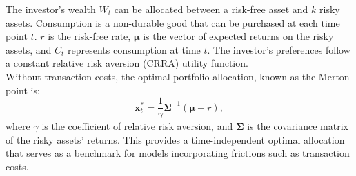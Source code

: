 \documentclass[11pt]{article}
\begin{document}
The investor's wealth \(W_t\) can be allocated between a risk-free asset and \(k\) risky assets.
Consumption is a non-durable good that can be purchased at each time point \(t\).
\(r\) is the risk-free rate, \(\boldsymbol{\mu}\) is the vector of expected returns on the risky assets, and \(C_t\) represents consumption at time \(t\). The investor’s preferences follow a constant relative risk aversion (CRRA) utility function.\\
Without transaction costs, the optimal portfolio allocation, known as the Merton point is:
\begin{equation}
    \mathbf{x}_t^* = \frac{1}{\gamma} \boldsymbol{\Sigma}^{-1} (\boldsymbol{\mu} - r ),
\end{equation}
where \(\gamma\) is the coefficient of relative risk aversion, and \(\boldsymbol{\Sigma}\) is the covariance matrix of the risky assets' returns.
This provides a time-independent optimal allocation that serves as a benchmark for models incorporating frictions such as transaction costs.
\end{document}
